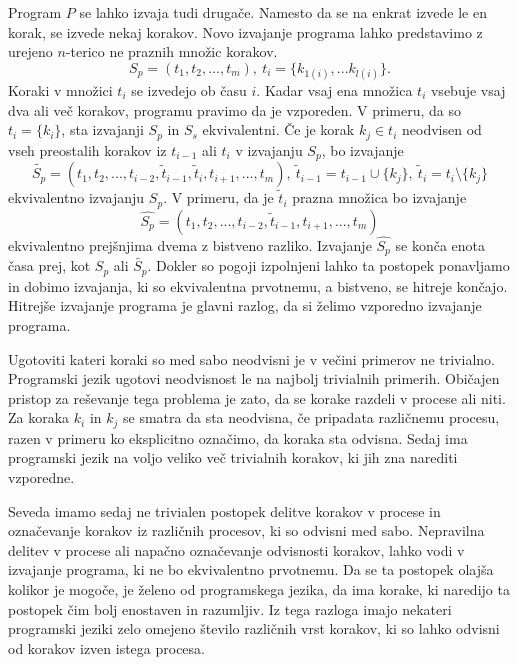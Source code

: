 Program $P$ se lahko izvaja tudi drugače. Namesto da se na enkrat izvede le en korak, se izvede nekaj korakov. Novo izvajanje programa lahko predstavimo z urejeno $n$-terico ne praznih množic korakov. 
$$S_p = (t_1, t_2, ... , t_m),\ t_i = \{ k_{1(i)},...k_{l(i)} \}.$$
Koraki v množici $t_i$ se izvedejo ob času $i$. Kadar vsaj ena množica $t_i$ vsebuje vsaj dva ali več korakov, programu pravimo da je vzporeden. V primeru, da so $t_i = \{k_i\}$, sta izvajanji $S_p$ in $S_s$ ekvivalentni.
Če je korak $k_j \in t_i$ neodvisen od vseh preostalih korakov iz $t_{i-1}$ ali $t_i$ v izvajanju $S_p$, bo izvajanje 
$$\tilde{S_p} = (t_1, t_2, ... , t_{i-2}, \tilde{t}_{i-1}, \tilde{t}_i, t_{i+1}, ..., t_m),\ \tilde{t}_{i-1} =t_{i-1} \cup \{k_j\},\ \tilde{t}_i = t_i \setminus \{k_j\}$$ 
ekvivalentno izvajanju $S_p$. 
V primeru, da je $\tilde{t}_i$ prazna množica bo izvajanje 
$$\hat{S_p} = (t_1, t_2, ... , t_{i-2}, \tilde{t}_{i-1}, t_{i+1}, ..., t_m)$$
ekvivalentno prejšnjima dvema z bistveno razliko. Izvajanje $\hat{S_p}$ se konča enota časa prej, kot $S_p$ ali $\tilde{S_p}$. Dokler so pogoji izpolnjeni lahko ta postopek ponavljamo in dobimo izvajanja, ki so ekvivalentna prvotnemu, a bistveno, se hitreje končajo.
Hitrejše izvajanje programa je glavni razlog, da si želimo vzporedno izvajanje programa.


Ugotoviti kateri koraki so med sabo neodvisni je v večini primerov ne trivialno. Programski jezik ugotovi neodvisnost le na najbolj trivialnih primerih. Običajen pristop za reševanje tega problema je zato, da se korake razdeli v procese ali niti. Za koraka $k_i$ in $k_j$ se smatra da sta neodvisna, če pripadata različnemu procesu, razen v primeru ko eksplicitno označimo, da koraka sta odvisna. Sedaj ima programski jezik na voljo veliko več trivialnih korakov, ki jih zna narediti vzporedne. 

Seveda imamo sedaj ne trivialen postopek delitve korakov v procese in označevanje korakov iz različnih procesov, ki so odvisni med sabo. Nepravilna delitev v procese ali napačno označevanje odvisnosti korakov, lahko vodi v izvajanje programa, ki ne bo ekvivalentno prvotnemu. Da se ta postopek olajša kolikor je mogoče, je želeno od programskega jezika, da ima korake, ki naredijo ta postopek čim bolj enostaven in razumljiv. Iz tega razloga imajo nekateri programski jeziki zelo omejeno število različnih vrst korakov, ki so lahko odvisni od korakov izven istega procesa.


